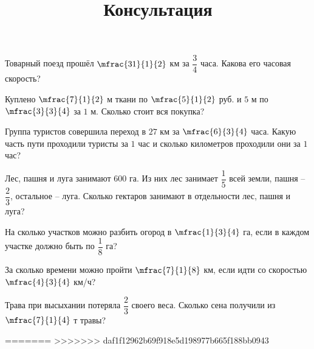 		\newpage
		\title{Консультация}
	\begin{listofex}
			\item Товарный поезд прошёл \( \mfrac{31}{1}{2} \) км за \( \dfrac{3}{4} \) часа. Какова его часовая скорость?
			\item Куплено \( \mfrac{7}{1}{2} \) м ткани по \( \mfrac{5}{1}{2} \) руб. и \( 5 \) м по \( \mfrac{3}{3}{4} \) за \( 1 \) м. Сколько стоит вся покупка?
			\item Группа туристов совершила переход в \( 27 \) км за \( \mfrac{6}{3}{4} \) часа. Какую часть пути проходили туристы за \( 1 \) час и сколько километров проходили они за \( 1 \) час?
			\item Лес, пашня и луга занимают \( 600 \) га. Из них лес занимает \( \dfrac{1}{5} \) всей земли, пашня -- \( \dfrac{2}{3} \), остальное -- луга. Сколько гектаров занимают в отдельности лес, пашня и луга?
			\item На сколько участков можно разбить огород в \( \mfrac{1}{3}{4} \) га, если в каждом участке должно быть по \( \dfrac{1}{8} \) га?
			\item За сколько времени можно пройти \( \mfrac{7}{1}{8} \) км, если идти со скоростью \( \mfrac{4}{3}{4} \) км/ч?
			\item Трава при высыхании потеряла \( \dfrac{2}{3} \) своего веса. Сколько сена получили из \( \mfrac{7}{1}{4} \) т травы?
	\end{listofex}
=======
>>>>>>> daf1f12962b69f918e5d198977b665f188bb0943
